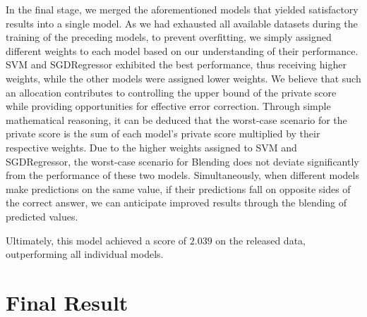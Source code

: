 \documentclass[10pt,letterpaper]{article}
\begin{document}
In the final stage, we merged the aforementioned models that yielded satisfactory results into a single model. 
As we had exhausted all available datasets during the training of the preceding models, 
to prevent overfitting, we simply assigned different weights to each model based on our understanding of their performance. 
SVM and SGDRegressor exhibited the best performance, thus receiving higher weights, 
while the other models were assigned lower weights. 
We believe that such an allocation contributes to controlling the upper bound of the private score while providing opportunities for effective error correction. 
Through simple mathematical reasoning, 
it can be deduced that the worst-case scenario for the private score is the sum of each model's private score multiplied by their respective weights. 
Due to the higher weights assigned to SVM and SGDRegressor, the worst-case scenario for Blending does not deviate significantly from the performance of these two models. 
Simultaneously, when different models make predictions on the same value, 
if their predictions fall on opposite sides of the correct answer, 
we can anticipate improved results through the blending of predicted values.

Ultimately, this model achieved a score of $2.039$ on the released data, outperforming all individual models.

\section{Final Result}

\newpage






\end{document}
